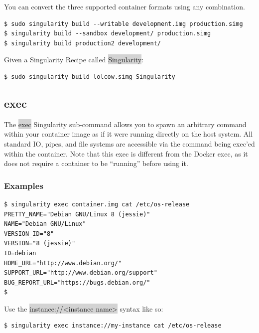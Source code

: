 \documentclass[a4paper]{article}
\newcounter{subsubsubsection}[subsubsection]
\begin{document}
You can convert the three supported container formats using any combination.
\begin{lstlisting}[frame=single]
$ sudo singularity build --writable development.img production.simg
$ singularity build --sandbox development/ production.simg
$ singularity build production2 development/
\end{lstlisting}
	

	
Given a Singularity Recipe called \colorbox{lightgray}{Singularity}:
	
\begin{lstlisting}[frame=single]
$ sudo singularity build lolcow.simg Singularity 
\end{lstlisting}

\subsection{exec}
\label{sec:exec}

The \colorbox{lightgray}{exec} Singularity sub-command allows you to spawn an arbitrary command within your container image as if it were running directly on the host system. All standard IO, pipes, and file systems are accessible via the command being exec’ed within the container. Note that this exec is different from the Docker exec, as it does not require a container to be “running” before using it.


\subsubsection{Examples}

\begin{lstlisting}[frame=single]
$ singularity exec container.img cat /etc/os-release
PRETTY_NAME="Debian GNU/Linux 8 (jessie)"
NAME="Debian GNU/Linux"
VERSION_ID="8"
VERSION="8 (jessie)"
ID=debian
HOME_URL="http://www.debian.org/"
SUPPORT_URL="http://www.debian.org/support"
BUG_REPORT_URL="https://bugs.debian.org/"
$ 
\end{lstlisting}
	
	
Use the \colorbox{lightgray}{instance://\textless{instance name}\textgreater} syntax like so:
\begin{lstlisting}[frame=single]
$ singularity exec instance://my-instance cat /etc/os-release
\end{lstlisting}
\end{document}
